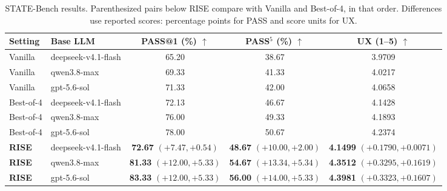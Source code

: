 \documentclass{article}
\begin{document}
\begin{table}[!htb]
\centering
\scriptsize
\setlength{\tabcolsep}{2.5pt}
\renewcommand{\arraystretch}{1.12}
\caption{STATE-Bench results. Parenthesized pairs below RISE compare with Vanilla and Best-of-4, in that order. Differences use reported scores: percentage points for PASS and score units for UX.}
\label{tab:statebench-models}
\begin{tabular*}{\linewidth}{@{\extracolsep{\fill}}llccc@{}}
\toprule
Setting & Base LLM & \shortstack{PASS@1\\(\%) $\uparrow$} & \shortstack{PASS$^5$\\(\%) $\uparrow$} & \shortstack{UX\\(1--5) $\uparrow$} \\
\midrule
Vanilla & deepseek-v4.1-flash & 65.20 & 38.67 & 3.9709 \\
Vanilla & qwen3.8-max & 69.33 & 41.33 & 4.0217 \\
Vanilla & gpt-5.6-sol & 71.33 & 42.00 & 4.0658 \\
\midrule
Best-of-4 & deepseek-v4.1-flash & 72.13 & 46.67 & 4.1428 \\
Best-of-4 & qwen3.8-max & 76.00 & 49.33 & 4.1893 \\
Best-of-4 & gpt-5.6-sol & 78.00 & 50.67 & 4.2374 \\
\midrule
\textbf{RISE} & deepseek-v4.1-flash & \shortstack[c]{\textbf{72.67}\\[-1pt]{\scriptsize $(+7.47,+0.54)$}} & \shortstack[c]{\textbf{48.67}\\[-1pt]{\scriptsize $(+10.00,+2.00)$}} & \shortstack[c]{\textbf{4.1499}\\[-1pt]{\scriptsize $(+0.1790,+0.0071)$}} \\
\textbf{RISE} & qwen3.8-max & \shortstack[c]{\textbf{81.33}\\[-1pt]{\scriptsize $(+12.00,+5.33)$}} & \shortstack[c]{\textbf{54.67}\\[-1pt]{\scriptsize $(+13.34,+5.34)$}} & \shortstack[c]{\textbf{4.3512}\\[-1pt]{\scriptsize $(+0.3295,+0.1619)$}} \\
\textbf{RISE} & gpt-5.6-sol & \shortstack[c]{\textbf{83.33}\\[-1pt]{\scriptsize $(+12.00,+5.33)$}} & \shortstack[c]{\textbf{56.00}\\[-1pt]{\scriptsize $(+14.00,+5.33)$}} & \shortstack[c]{\textbf{4.3981}\\[-1pt]{\scriptsize $(+0.3323,+0.1607)$}} \\
\bottomrule
\end{tabular*}
\end{table}
\end{document}
